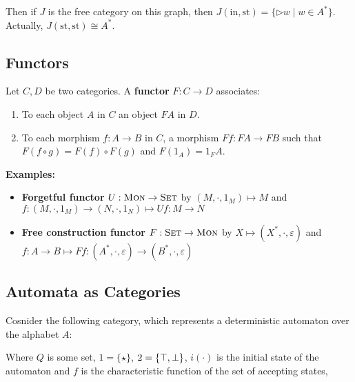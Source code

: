 Then if $J$ is the free category on this graph, then $J(\mathrm{in, st}) = \{\rhd w \mid w\in A^*\}$.
Actually, $J(\mathrm{st, st}) \cong A^*$.


\subsection{Functors}
Let $C, D$ be two categories. A \textbf{functor} $F: C \to D$ associates: 
\begin{enumerate}
\item To each object $A$ in $C$ an object $FA$ in $D$.
\item To each morphism $f: A \to B$ in $C$, a morphism $Ff : FA \to FB$ such that $F (f \circ g) = F(f) \circ F(g)$ and $F(1_A) = 1_FA$.
\end{enumerate}

\textbf{Examples:}
\begin{itemize}
\item \textbf{Forgetful functor} $U : \text{\textsc{Mon}} \to \text{\textsc{Set}}$ by $(M, \cdot, 1_M) \mapsto M$ and 
$f: (M, \cdot, 1_M) \to (N, \cdot, 1_N) \mapsto Uf: M \to N$
\item \textbf{Free construction functor} $F : \text{\textsc{Set}} \to \text{\textsc{Mon}}$ by $X \mapsto (X^*, \cdot, \varepsilon)$
and $f: A \to B \mapsto Ff: (A^*, \cdot, \varepsilon) \to (B^*, \cdot, \varepsilon)$
\end{itemize}

\subsection{Automata as Categories}

Cosnider the following category, which represents a deterministic automaton over the alphabet $A$:
\begin{figure}
\end{figure}

Where $Q$ is some set, $1 = \{\star\}$, $2 = \{\top, \perp\}$, $i(\cdot)$ is the initial state of the automaton and $f$ is the
characteristic function of the set of accepting states,

